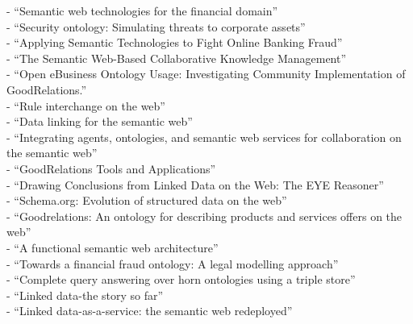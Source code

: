 - ``Semantic web technologies for the financial domain'' \citep{lara2007semantic} \\
- ``Security ontology: Simulating threats to corporate assets'' \citep{ekelhart2006security} \\
- ``Applying Semantic Technologies to Fight Online Banking Fraud'' \citep{carvalhoapplying} \\
- ``The Semantic Web-Based Collaborative Knowledge Management'' \citep{chao2012semantic} \\
- ``Open eBusiness Ontology Usage: Investigating Community Implementation of GoodRelations.'' \citep{ashraf2011open} \\
- ``Rule interchange on the web'' \citep{boley2007rule} \\
- ``Data linking for the semantic web'' \citep{scharffe2011data} \\
- ``Integrating agents, ontologies, and semantic web services for collaboration on the semantic web'' \citep{stollberg2005integrating} \\
- ``GoodRelations Tools and Applications'' \citep{hepp2009goodrelations} \\
- ``Drawing Conclusions from Linked Data on the Web: The EYE Reasoner'' \citep{verborgh2015drawing} \\
- ``Schema.org: Evolution of structured data on the web'' \citep{guha2016schema} \\
- ``Goodrelations: An ontology for describing products and services offers on the web'' \citep{hepp2008goodrelations} \\
- ``A functional semantic web architecture'' \citep{gerber2008functional} \\
- ``Towards a financial fraud ontology: A legal modelling approach'' \citep{kingston2004towards} \\
- ``Complete query answering over horn ontologies using a triple store'' \citep{zhou2013complete} \\
- ``Linked data-the story so far'' \citep{bizer2009linked} \\
- ``Linked data-as-a-service: the semantic web redeployed'' \citep{rietveld2015linked}


